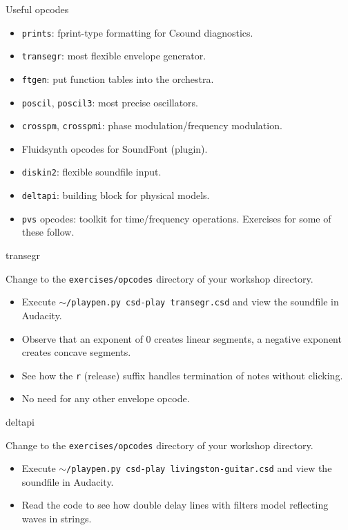 \documentclass{beamer}
\begin{document}
\begin{frame}{Useful opcodes}
\begin{itemize}
\item \texttt{prints}: fprint-type formatting for Csound diagnostics.
\item \texttt{transegr}: most flexible envelope generator.
\item \texttt{ftgen}: put function tables into the orchestra.
\item \texttt{poscil}, \texttt{poscil3}: most precise oscillators.
\item \texttt{crosspm}, \texttt{crosspmi}: phase modulation/frequency modulation.
\item Fluidsynth opcodes for SoundFont (plugin).
\item \texttt{diskin2}: flexible soundfile input.
\item \texttt{deltapi}: building block for physical models.
\item \texttt{pvs} opcodes: toolkit for time/frequency operations.
Exercises for some of these follow.
\end{itemize}
\end{frame}

\begin{frame}{transegr}
\begin{example}
Change to the \texttt{exercises/opcodes} directory of your workshop directory.
\begin{itemize}
\item Execute \texttt{$\sim$/playpen.py csd-play transegr.csd} and view the soundfile in Audacity.
\end{itemize}
\end{example}
\begin{itemize}
\item Observe that an exponent of 0 creates linear segments, a negative exponent creates concave segments.
\item See how the \texttt{r} (release) suffix handles termination of notes without clicking.
\item No need for any other envelope opcode.
\end{itemize}
\end{frame}

\begin{frame}{deltapi}
\begin{example}
Change to the \texttt{exercises/opcodes} directory of your workshop directory.
\begin{itemize}
\item Execute \texttt{$\sim$/playpen.py csd-play livingston-guitar.csd} and view the soundfile in Audacity.
\item Read the code to see how double delay lines with filters model reflecting waves in strings.
\end{itemize}
\end{example}
\end{frame}
\end{document}
